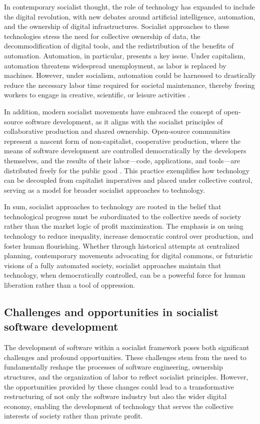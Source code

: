 \begin{refsection}
In contemporary socialist thought, the role of technology has expanded to include the digital revolution, with new debates around artificial intelligence, automation, and the ownership of digital infrastructures. Socialist approaches to these technologies stress the need for collective ownership of data, the decommodification of digital tools, and the redistribution of the benefits of automation. Automation, in particular, presents a key issue. Under capitalism, automation threatens widespread unemployment, as labor is replaced by machines. However, under socialism, automation could be harnessed to drastically reduce the necessary labor time required for societal maintenance, thereby freeing workers to engage in creative, scientific, or leisure activities \cite[pp.~98]{mason}.

In addition, modern socialist movements have embraced the concept of open-source software development, as it aligns with the socialist principles of collaborative production and shared ownership. Open-source communities represent a nascent form of non-capitalist, cooperative production, where the means of software development are controlled democratically by the developers themselves, and the results of their labor—code, applications, and tools—are distributed freely for the public good \cite[pp.~53]{raymond}. This practice exemplifies how technology can be decoupled from capitalist imperatives and placed under collective control, serving as a model for broader socialist approaches to technology.

In sum, socialist approaches to technology are rooted in the belief that technological progress must be subordinated to the collective needs of society rather than the market logic of profit maximization. The emphasis is on using technology to reduce inequality, increase democratic control over production, and foster human flourishing. Whether through historical attempts at centralized planning, contemporary movements advocating for digital commons, or futuristic visions of a fully automated society, socialist approaches maintain that technology, when democratically controlled, can be a powerful force for human liberation rather than a tool of oppression.

\subsection{Challenges and opportunities in socialist software development}

The development of software within a socialist framework poses both significant challenges and profound opportunities. These challenges stem from the need to fundamentally reshape the processes of software engineering, ownership structures, and the organization of labor to reflect socialist principles. However, the opportunities provided by these changes could lead to a transformative restructuring of not only the software industry but also the wider digital economy, enabling the development of technology that serves the collective interests of society rather than private profit.


\end{refsection}
